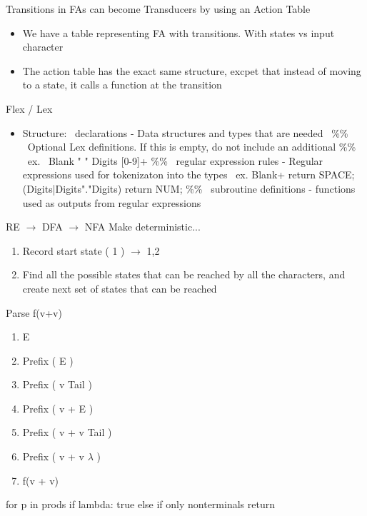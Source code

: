 \documentclass[11pt]{article}
\begin{document}
    Transitions in FAs can become Transducers by using an Action Table
    \begin{itemize}
        \item We have a table representing FA with transitions. With states vs input character
        \item The action table has the exact same structure, excpet that instead of moving to a state, it calls a function at the transition
    \end{itemize}

    Flex / Lex
    \begin{itemize}
        \item Structure: \
            declarations  - Data structures and types that are needed \
            \%\% \
            Optional Lex definitions. If this is empty, do not include an additional \%\% \
            ex. \
            Blank   " "
            Digits  [0-9]+
            \%\% \
            regular expression rules - Regular expressions used for tokenizaton into the types \
            ex.
            Blank+                      { return SPACE; }
            (Digits|Digits"."Digits)    { return NUM; }
            \%\% \
            subroutine definitions - functions used as outputs from regular expressions
    \end{itemize}

    RE $\to$ DFA $\to$ NFA
    Make deterministic...
    \begin{enumerate}
        \item Record start state ( {1} ) $\to$ {1,2}
        \item Find all the possible states that can be reached by all the characters, and create next set of states that can be reached
    \end{enumerate}

    Parse f(v+v)
    \begin{enumerate}
        \item E
        \item Prefix ( E )
        \item Prefix ( v Tail )
        \item Prefix ( v + E )
        \item Prefix ( v + v Tail )
        \item Prefix ( v + v $\lambda$ )
        \item f(v + v)
    \end{enumerate}
    
    for p in prods
        if lambda: true
        else if only nonterminals
            return 
\end{document}
